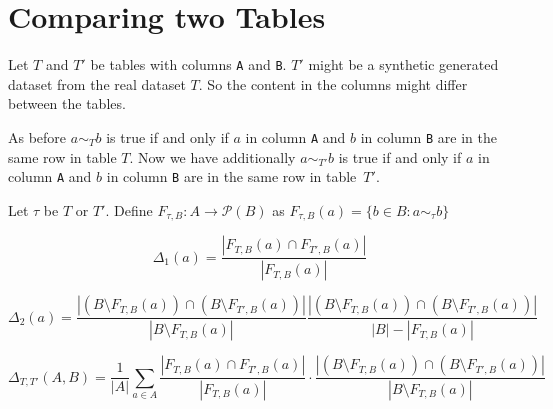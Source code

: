 \section{Comparing two Tables}

Let $T$ and $T'$ be tables with columns \texttt{A} and \texttt{B}.
$T'$ might be a synthetic generated dataset from the real dataset $T$.
So the content in the columns might differ between the tables.

As before $a \sim_T b$ is true if and only if $a$ in column \texttt{A} and $b$ in column \texttt{B} are in the same row in table $T$.
Now we have additionally $a \sim_{T'} b$ is true if and only if $a$ in column \texttt{A} and $b$ in column \texttt{B} are in the same row in table~$T'$.

Let $\tau$ be $T$ or $T'$. Define $F_{\tau, B} : A \to \mathcal{P}(B)$ as $F_{\tau, B}(a) = \{ b \in B : a \sim_\tau b \}$

\begin{equation}
  \Delta_1(a) = 
    \frac{\left|F_{T, B}(a) \cap F_{T', B}(a)\right|}{|F_{T, B}(a)|}
\end{equation}

\begin{equation}
  \Delta_2(a) = 
    \frac{\left|\left(B \setminus F_{T, B}(a)\right) \cap \left(B \setminus F_{T', B}(a)\right)\right|}{|B \setminus F_{T, B}(a)|}
    \frac{\left|\left(B \setminus F_{T, B}(a)\right) \cap \left(B \setminus F_{T', B}(a)\right)\right|}{|B| - |F_{T, B}(a)|}
\end{equation}

\begin{equation}
  \Delta_{T,T'}(A, B) = \frac{1}{|A|} 
    \sum_{a \in A}
    \frac{\left|F_{T, B}(a) \cap F_{T', B}(a)\right|}{|F_{T, B}(a)|}
    \cdot
    \frac{\left|\left(B \setminus F_{T, B}(a)\right) \cap \left(B \setminus F_{T', B}(a)\right)\right|}{|B \setminus F_{T, B}(a)|}
\end{equation}

